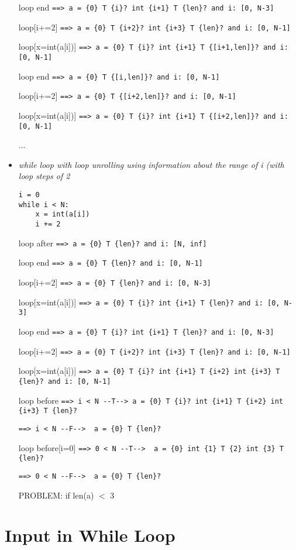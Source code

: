 \documentclass[11pt]{article}
\begin{document}
\begin{itemize}
loop end \verb|==> a = {0} T {i}? int {i+1} T {len}? and i: [0, N-3]|

loop[i+=2] \verb|==> a = {0} T {i+2}? int {i+3} T {len}? and i: [0, N-1]|

loop[x=int(a[i])] \verb|==> a = {0} T {i}? int {i+1} T {[i+1,len]}? and i: [0, N-1]|

loop end \verb|==> a = {0} T {[i,len]}? and i: [0, N-1]|

loop[i+=2] \verb|==> a = {0} T {[i+2,len]}? and i: [0, N-1]|

loop[x=int(a[i])] \verb|==> a = {0} T {i}? int {i+1} T {[i+2,len]}? and i: [0, N-1]|

...


\item \textit{while loop with loop unrolling using information about the range of i (with loop steps of 2}

\begin{lstlisting}[numbers=none]
i = 0
while i < N:
    x = int(a[i])
    i += 2
\end{lstlisting}

loop after \verb|==> a = {0} T {len}? and i: [N, inf]|

loop end \verb|==> a = {0} T {len}? and i: [0, N-1]|

loop[i+=2] \verb|==> a = {0} T {len}? and i: [0, N-3]|

loop[x=int(a[i])] \verb|==> a = {0} T {i}? int {i+1} T {len}? and i: [0, N-3]|

loop end \verb|==> a = {0} T {i}? int {i+1} T {len}? and i: [0, N-3]|

loop[i+=2] \verb|==> a = {0} T {i+2}? int {i+3} T {len}? and i: [0, N-1]|

loop[x=int(a[i])] \verb|==> a = {0} T {i}? int {i+1} T {i+2} int {i+3} T {len}? and i: [0, N-1]|

loop before \verb|==> i < N --T--> a = {0} T {i}? int {i+1} T {i+2} int {i+3} T {len}?| 

\verb|==> i < N --F-->  a = {0} T {len}?|

loop before[i=0] \verb|==> 0 < N --T-->  a = {0} int {1} T {2} int {3} T {len}?| 

\verb|==> 0 < N --F-->  a = {0} T {len}?|

PROBLEM: if len(a) $<$ 3

\end{itemize}

\section{Input in While Loop}
\end{document}
